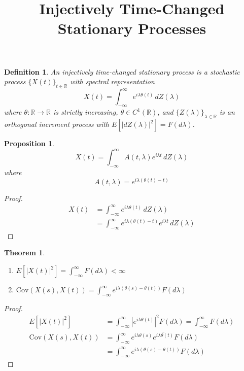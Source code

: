 \documentclass[11pt]{article}
\title{Injectively Time-Changed Stationary Processes}
\author{}
\date{}
\newtheorem{theorem}{Theorem}
\newtheorem{proposition}{Proposition}
\newtheorem{definition}{Definition}
\begin{document}
\maketitle

\begin{definition}
An \emph{injectively time-changed stationary process} is a stochastic process $\{X(t)\}_{t \in \mathbb{R}}$ with spectral representation
\begin{equation}
X(t) = \int_{-\infty}^{\infty} e^{i\lambda\theta(t)} \, dZ(\lambda)
\end{equation}
where $\theta: \mathbb{R} \to \mathbb{R}$ is strictly increasing, $\theta \in C^1(\mathbb{R})$, and $\{Z(\lambda)\}_{\lambda \in \mathbb{R}}$ is an orthogonal increment process with $E[|dZ(\lambda)|^2] = F(d\lambda)$.
\end{definition}

\begin{proposition}
\begin{equation}
X(t) = \int_{-\infty}^{\infty} A(t,\lambda) e^{i\lambda t} \, dZ(\lambda)
\end{equation}
where
\begin{equation}
A(t,\lambda) = e^{i\lambda(\theta(t)-t)}
\end{equation}
\end{proposition}

\begin{proof}
\begin{align}
X(t) &= \int_{-\infty}^{\infty} e^{i\lambda\theta(t)} \, dZ(\lambda)\\
&= \int_{-\infty}^{\infty} e^{i\lambda(\theta(t)-t)} e^{i\lambda t} \, dZ(\lambda)
\end{align}
\end{proof}

\begin{theorem}
\begin{enumerate}
\item $E[|X(t)|^2] = \int_{-\infty}^{\infty} F(d\lambda) < \infty$
\item $\text{Cov}(X(s),X(t)) = \int_{-\infty}^{\infty} e^{i\lambda(\theta(s)-\theta(t))} F(d\lambda)$
\end{enumerate}
\end{theorem}

\begin{proof}
\begin{align}
E[|X(t)|^2] &= \int_{-\infty}^{\infty} |e^{i\lambda\theta(t)}|^2 F(d\lambda) = \int_{-\infty}^{\infty} F(d\lambda)\\
\text{Cov}(X(s),X(t)) &= \int_{-\infty}^{\infty} e^{i\lambda\theta(s)} \overline{e^{i\lambda\theta(t)}} F(d\lambda)\\
&= \int_{-\infty}^{\infty} e^{i\lambda(\theta(s)-\theta(t))} F(d\lambda)
\end{align}
\end{proof}
\end{document}
